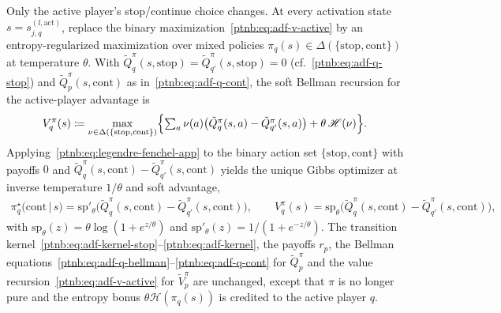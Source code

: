 Only the active player's stop/continue choice changes. At every activation state $s = s_{j,q}^{(l,
    \mathrm{act})}$, replace the binary maximization~\eqref{ptnb:eq:adf-v-active} by an entropy-regularized
maximization over mixed policies $\pi_q(s) \in \Delta(\{\mathrm{stop},\mathrm{cont}\})$ at
temperature $\theta$. With $\tilde Q_q^\pi(s, \mathrm{stop}) = \tilde Q_{q'}^\pi(s, \mathrm{stop})
    = 0$ (cf.~\eqref{ptnb:eq:adf-q-stop}) and $\tilde Q_p^\pi(s, \mathrm{cont})$ as
in~\eqref{ptnb:eq:adf-q-cont}, the soft Bellman recursion for the active-player advantage is
\begin{align}\label{ptnb:eq:softplus-soft-bellman}
    V_q^\pi(s)
    \coloneqq
    \max_{\nu \in \Delta(\{\mathrm{stop},\mathrm{cont}\})} \Bigl\{
    \textstyle\sum_{a} \nu(a)\bigl(\tilde Q_q^\pi(s, a) - \tilde Q_{q'}^\pi(s, a)\bigr)
    + \theta\, \mathcal{H}(\nu)
    \Bigr\}.
\end{align}
Applying~\eqref{ptnb:eq:legendre-fenchel-app} to the binary action set $\{\mathrm{stop},\mathrm{cont}\}$
with payoffs $0$ and $\tilde Q_q^\pi(s, \mathrm{cont}) - \tilde Q_{q'}^\pi(s, \mathrm{cont})$
yields the unique Gibbs optimizer at inverse temperature $1/\theta$ and soft advantage,
\begin{align}\label{ptnb:eq:softplus-policy}
    \pi_q^\star\!\bigl(\mathrm{cont} \,\big|\, s\bigr)
    = \mathrm{sp}'_\theta\bigl(\tilde Q_q^\pi(s, \mathrm{cont}) - \tilde Q_{q'}^\pi(s,
    \mathrm{cont})\bigr),
    \qquad
    V_q^\pi(s)
    = \mathrm{sp}_\theta\bigl(\tilde Q_q^\pi(s, \mathrm{cont}) - \tilde Q_{q'}^\pi(s,
    \mathrm{cont})\bigr),
\end{align}
with $\mathrm{sp}_\theta(z) = \theta\log(1+e^{z/\theta})$ and $\mathrm{sp}'_\theta(z) =
    1/(1+e^{-z/\theta})$. The transition kernel~\eqref{ptnb:eq:adf-kernel-stop}--\eqref{ptnb:eq:adf-kernel}, the
payoffs $r_p$, the Bellman equations~\eqref{ptnb:eq:adf-q-bellman}--\eqref{ptnb:eq:adf-q-cont} for $\tilde
    Q_p^\pi$ and the value recursion~\eqref{ptnb:eq:adf-v-active} for $\tilde V_p^\pi$ are unchanged, except
that $\pi$ is no longer pure and the entropy bonus $\theta\mathcal{H}(\pi_q(s))$ is credited to the
active player $q$.


